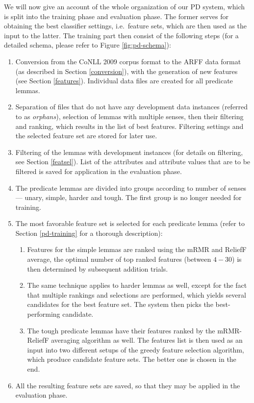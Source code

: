\documentclass[12pt,notitlepage]{report}
\begin{document}
We will now give an account of the whole organization of our PD system, which is split into the training phase and evaluation phase. The former serves for obtaining the best classifier settings, i.e.\ feature sets, which are then used as the input to the latter. The training part then consist of the following steps (for a detailed schema, please refer to Figure \ref{fig:pd-schema}):
\begin{enumerate}
    \item Conversion from the CoNLL 2009 corpus format to the ARFF data format (as described in Section \ref{conversion}), with the generation of new features (see Section \ref{features}). Individual data files are created for all predicate lemmas.
    \item Separation of files that do not have any development data instances (referred to as \emph{orphans}), selection of lemmas with multiple senses, then their filtering and ranking, which results in the list of best features. Filtering settings and the selected feature set are stored for later use.
    \item Filtering of the lemmas with development instances (for details on filtering, see Section \ref{featsel}). List of the attributes and attribute values that are to be filtered is saved for application in the evaluation phase.
    \item The predicate lemmas are divided into groups according to number of senses --- unary, simple, harder and tough. The first group is no longer needed for training.
    \item The most favorable feature set is selected for each predicate lemma (refer to Section \ref{pd-training} for a thorough description):
    \begin{enumerate}
        \item Features for the simple lemmas are ranked using the mRMR and ReliefF average, the optimal number of top ranked features (between $4-30$) is then determined by subsequent addition trials.
        \item The same technique applies to harder lemmas as well, except for the fact that multiple rankings and selections are performed, which yields several candidates for the best feature set. The system then picks the best-performing candidate.
        \item The tough predicate lemmas have their features ranked by the mRMR-ReliefF averaging algorithm as well. The features list is then used as an input into two different setups of the greedy feature selection algorithm, which produce candidate feature sets. The better one is chosen in the end.
    \end{enumerate}
    \item All the resulting feature sets are saved, so that they may be applied in the evaluation phase.
\end{enumerate}
\end{document}
